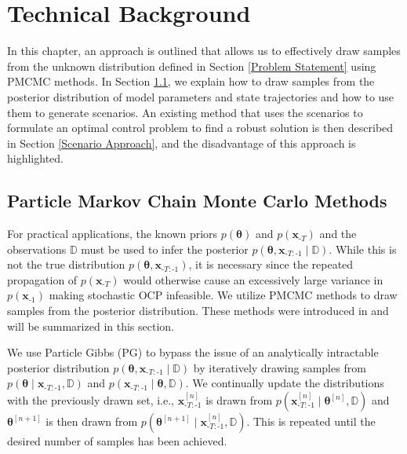 \chapter{Technical Background} \label{Technical Background}

In this chapter, an approach is outlined that allows us to effectively draw samples from the unknown distribution defined in Section \ref{Problem Statement} using PMCMC methods. In Section \ref{PGibbs sampling}, we explain how to draw samples from the posterior distribution of model parameters and state trajectories and how to use them to generate scenarios. An existing method that uses the scenarios to formulate an optimal control problem to find a robust solution is then described in Section \ref{Scenario Approach}, and the disadvantage of this approach is highlighted.

\section{Particle Markov Chain Monte Carlo Methods} \label{PGibbs sampling}

For practical applications, the known priors $p(\boldsymbol{\theta})$ and $p(\boldsymbol{x}_{\text{-}T})$ and the observations $\mathbb{D}$ must be used to infer the posterior $p(\boldsymbol{\theta}, \boldsymbol{x}_{\text{-}T:\text{-}1}\mid \mathbb{D})$. While this is not the true distribution $p(\boldsymbol{\theta}, \boldsymbol{x}_{\text{-}T:\text{-}1})$, it is necessary since the repeated propagation of $p(\boldsymbol{x}_{\text{-}T})$ would otherwise cause an excessively large variance in $p(\boldsymbol{x}_{\text{-}1})$ making stochastic OCP infeasible. We utilize PMCMC methods to draw samples from the posterior distribution. These methods were introduced in \cite{Andrieu_10} and will be summarized in this section.

We use Particle Gibbs (PG) to bypass the issue of an analytically intractable posterior distribution $p(\boldsymbol{\theta}, \boldsymbol{x}_{\text{-}T:\text{-}1}\mid \mathbb{D})$ by iteratively drawing samples from $p(\boldsymbol{\theta} \mid \boldsymbol{x}_{\text{-}T:\text{-}1}, \mathbb{D})$ and $p(\boldsymbol{x}_{\text{-}T:\text{-}1}\mid \boldsymbol{\theta}, \mathbb{D})$. We continually update the distributions with the previously drawn set, i.e., $\boldsymbol{x}_{\text{-}T:\text{-}1}^{[n]}$ is drawn from $p(\boldsymbol{x}_{\text{-}T:\text{-}1}^{[n]}\mid \boldsymbol{\theta}^{[n]}, \mathbb{D})$ and $\boldsymbol{\theta}^{[n+1]}$ is then drawn from $p(\boldsymbol{\theta}^{[n+1]}\mid \boldsymbol{x}_{\text{-}T:\text{-}1}^{[n]}, \mathbb{D})$. This is repeated until the desired number of samples has been achieved.

